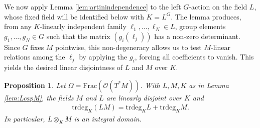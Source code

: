 \documentclass[11pt]{amsart}
\newtheorem{proposition}[theorem]{Proposition}
\theoremstyle{definition}
\theoremstyle{plain}
\newtheorem{remark}[theorem]{Remark}
\theoremstyle{conclusion}
\begin{document}
 We now apply Lemma \ref{lem:artinindependence} to the left $G$-action on the field $L$, whose fixed field will be identified below with $K=L^G$. The lemma produces, from any $K$-linearly independent family $\ell_1,\ldots,\ell_N\in L$, group elements $g_1,\ldots,g_N\in G$ such that the matrix $(g_i(\ell_j))$ has a non-zero determinant. Since $G$ fixes $M$ pointwise, this non-degeneracy allows us to test $M$-linear relations among the $\ell_j$ by applying the $g_i$, forcing all coefficients to vanish. This yields the desired linear disjointness of $L$ and $M$ over $K$.


\begin{proposition} 
\label{prop:algdisjoint} \cite[Chapter VIII, Section 3 and 4]{LangAlgebra}
Let $\Omega = \mathrm{Frac} (\mathcal{O}(T^*M))$. With $L,M,K$ as in Lemma \ref{lem:LcapM}, the fields $M$ and $L$ are linearly disjoint over $K$ and
\begin{align*}
\mathrm{trdeg}_K(LM)=\mathrm{trdeg}_K L+\mathrm{trdeg}_K M.
\end{align*} In particular, $L \otimes_K M$ is an integral domain.
\end{proposition}


 
\end{document}
